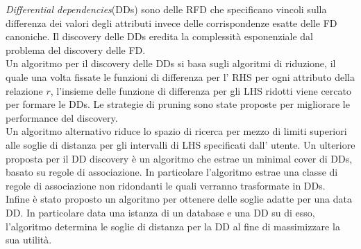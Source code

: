 \textit{Differential dependencies}(DDs) sono delle RFD che specificano vincoli sulla differenza dei valori degli attributi invece delle corrispondenze esatte delle FD canoniche. Il discovery delle DDs eredita la complessità esponenziale dal problema del discovery delle FD.\\ Un algoritmo per il discovery delle DDs si basa sugli algoritmi di riduzione, il quale una volta fissate le funzioni di differenza per l' RHS  per ogni attributo della relazione $r$, l'insieme delle funzione di differenza per gli LHS ridotti viene cercato per formare le DDs. Le strategie di pruning sono state proposte per migliorare le performance del discovery.\\ Un algoritmo alternativo riduce lo spazio di ricerca per mezzo di limiti superiori alle soglie di distanza per gli intervalli di LHS specificati dall' utente. Un ulteriore proposta per il DD discovery è un algoritmo che estrae un minimal cover di DDs, basato su regole di associazione. In particolare l'algoritmo estrae una classe di regole di associazione non ridondanti le quali verranno trasformate in DDs.\\ Infine è stato proposto un algoritmo per ottenere delle soglie adatte per una data DD. In particolare data una istanza di un database e una DD su di esso, l'algoritmo determina le soglie di distanza per la DD al fine di massimizzare la sua utilità. 
